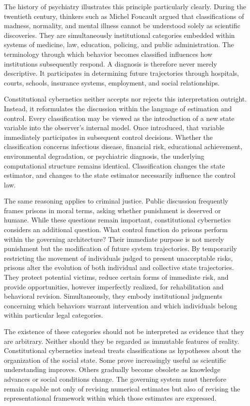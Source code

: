 \documentclass[12pt,a4paper]{article}
\begin{document}
The history of psychiatry illustrates this principle particularly clearly. During the twentieth century, thinkers such as Michel Foucault argued that classifications of madness, normality, and mental illness cannot be understood solely as scientific discoveries. They are simultaneously institutional categories embedded within systems of medicine, law, education, policing, and public administration. The terminology through which behavior becomes classified influences how institutions subsequently respond. A diagnosis is therefore never merely descriptive. It participates in determining future trajectories through hospitals, courts, schools, insurance systems, employment, and social relationships.

Constitutional cybernetics neither accepts nor rejects this interpretation outright. Instead, it reformulates the discussion within the language of estimation and control. Every classification may be viewed as the introduction of a new state variable into the observer's internal model. Once introduced, that variable immediately participates in subsequent control decisions. Whether the classification concerns infectious disease, financial risk, educational achievement, environmental degradation, or psychiatric diagnosis, the underlying computational structure remains identical. Classification changes the state estimator, and changes to the state estimator necessarily influence the control law.

The same reasoning applies to criminal justice. Public discussion frequently frames prisons in moral terms, asking whether punishment is deserved or humane. While these questions remain important, constitutional cybernetics considers an additional question. What control function do prisons perform within the governing architecture? Their immediate purpose is not merely punishment but the modification of future system trajectories. By temporarily restricting the movement of individuals judged to present unacceptable risks, prisons alter the evolution of both individual and collective state trajectories. They protect potential victims, reduce certain forms of immediate risk, and provide opportunities, however imperfectly realized, for rehabilitation and behavioral revision. Simultaneously, they embody institutional judgments concerning which behaviors warrant intervention and which individuals belong within particular legal categories.

The existence of these categories should not be interpreted as evidence that they are arbitrary. Neither should they be regarded as immutable features of reality. Constitutional cybernetics instead treats classifications as hypotheses about the organization of the social state. Some prove increasingly useful as scientific understanding improves. Others gradually become obsolete as knowledge advances or social conditions change. The governing system must therefore remain capable not only of revising numerical estimates but also of revising the representational framework within which those estimates are expressed.
\end{document}
